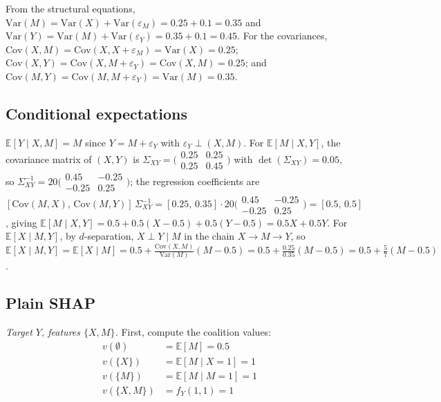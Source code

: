 From the structural equations,
$\mathrm{Var}(M)=\mathrm{Var}(X)+\mathrm{Var}(\varepsilon_M)=0.25+0.1=0.35$ and
$\mathrm{Var}(Y)=\mathrm{Var}(M)+\mathrm{Var}(\varepsilon_Y)=0.35+0.1=0.45$.
For the covariances,
$\mathrm{Cov}(X,M)=\mathrm{Cov}(X,X+\varepsilon_M)=\mathrm{Var}(X)=0.25$;
$\mathrm{Cov}(X,Y)=\mathrm{Cov}(X,M+\varepsilon_Y)=\mathrm{Cov}(X,M)=0.25$;
and
$\mathrm{Cov}(M,Y)=\mathrm{Cov}(M,M+\varepsilon_Y)=\mathrm{Var}(M)=0.35$.

\subsection{Conditional expectations}\label{app:signal_condexp}

$\mathbb{E}[Y\mid X,M]=M$ since $Y=M+\varepsilon_Y$ with $\varepsilon_Y\perp(X,M)$.
For $\mathbb{E}[M\mid X,Y]$, the covariance matrix of $(X,Y)$ is
$\Sigma_{XY}=\bigl(\begin{smallmatrix}0.25&0.25\\0.25&0.45\end{smallmatrix}\bigr)$
with $\det(\Sigma_{XY})=0.05$, so
$\Sigma_{XY}^{-1}=20\bigl(\begin{smallmatrix}0.45&-0.25\\-0.25&0.25\end{smallmatrix}\bigr)$;
the regression coefficients are
$[\mathrm{Cov}(M,X),\,\mathrm{Cov}(M,Y)]\,\Sigma_{XY}^{-1}
=[0.25,\,0.35]\cdot 20\bigl(\begin{smallmatrix}0.45&-0.25\\-0.25&0.25\end{smallmatrix}\bigr)
=[0.5,\,0.5]$,
giving $\mathbb{E}[M\mid X,Y]=0.5+0.5(X-0.5)+0.5(Y-0.5)=0.5X+0.5Y$.
For $\mathbb{E}[X\mid M,Y]$, by $d$-separation, $X\perp Y\mid M$ in the chain
$X\!\to\!M\!\to\!Y$, so $\mathbb{E}[X\mid M,Y]=\mathbb{E}[X\mid M]
=0.5+\tfrac{\mathrm{Cov}(X,M)}{\mathrm{Var}(M)}(M-0.5)
=0.5+\tfrac{0.25}{0.35}(M-0.5)=0.5+\tfrac{5}{7}(M-0.5)$.

\subsection{Plain SHAP}\label{app:signal_plain}

\textit{Target $Y$, features $\{X, M\}$.} First, compute the coalition values:
\begin{align}
v(\emptyset) &= \mathbb{E}[M] = 0.5 \\
v(\{X\}) &= \mathbb{E}[M \mid X=1] = 1 \\
v(\{M\}) &= \mathbb{E}[M \mid M=1] = 1 \\
v(\{X,M\}) &= f_Y(1,1) = 1
\end{align}

